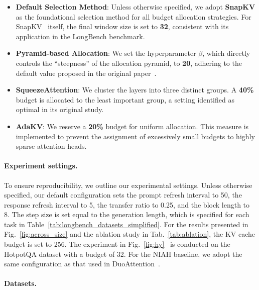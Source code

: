 \begin{itemize}
    \item \textbf{Default Selection Method}: Unless otherwise specified, we adopt \textbf{SnapKV} as the foundational selection method for all budget allocation strategies. For SnapKV~\citep{li2024snapkv} itself, the final window size is set to \textbf{32}, consistent with its application in the LongBench benchmark.
    \item \textbf{Pyramid-based Allocation}: We set the hyperparameter $\beta$, which directly controls the ``steepness''
    of the allocation pyramid, to \textbf{20}, adhering to the default value proposed in the original paper~\citep{cai2024pyramidkv}.
    \item \textbf{SqueezeAttention}: We cluster the layers into three distinct groups. A \textbf{40\%} budget is allocated to the least important group, a setting identified as optimal in its original study.
    \item \textbf{AdaKV}\citep{feng2024ada}: We reserve a \textbf{20\%} budget for uniform allocation. This measure is implemented to prevent the assignment of excessively small budgets to highly sparse attention heads.
\end{itemize}


\paragraph{Experiment settings.}
To ensure reproducibility, we outline our experimental settings. Unless otherwise specified, our default configuration sets the prompt refresh interval to 50, the response refresh interval to 5, the transfer ratio to 0.25, and the block length to 8. The step size is set equal to the generation length, which is specified for each task in Table~\ref{tab:longbench_datasets_simplified}.
For the results presented in Fig.~\ref{fig:across_size} and the ablation study in Tab.~\ref{tab:ablation}, the KV cache budget is set to 256. The experiment in Fig.~\ref{fig:hy}~ is conducted on the HotpotQA dataset with a budget of 32. For the NIAH baseline, we adopt the same configuration as that used in DuoAttention~\citep{xiao2024duoattention}.





\paragraph{Datasets.}

